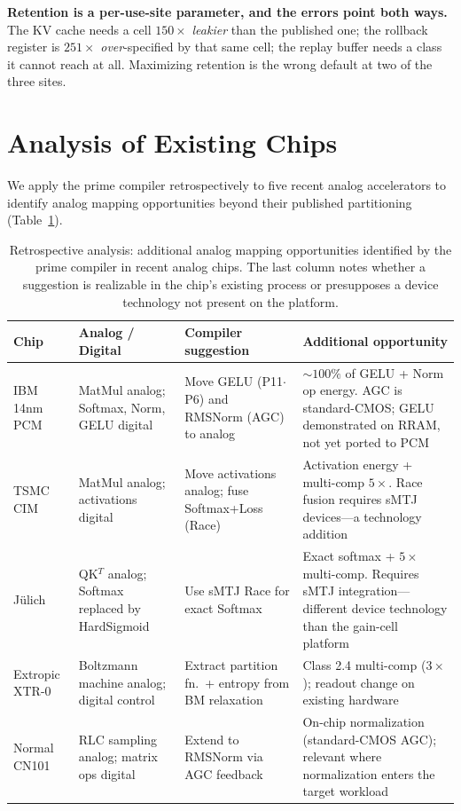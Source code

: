 \documentclass[11pt]{article}
\begin{document}
\textbf{Retention is a per-use-site parameter, and the errors point both ways.} The KV cache needs a cell $150\times$ \textit{leakier} than the published one; the rollback register is $251\times$ \textit{over}-specified by that same cell; the replay buffer needs a class it cannot reach at all. Maximizing retention is the wrong default at two of the three sites.

\section{Analysis of Existing Chips}
\label{sec:analysis}

We apply the prime compiler retrospectively to five recent analog accelerators to identify analog mapping opportunities beyond their published partitioning (Table~\ref{tab:chips}).

\begin{table}[t]
\centering
\caption{Retrospective analysis: additional analog mapping opportunities identified by the prime compiler in recent analog chips. The last column notes whether a suggestion is realizable in the chip's existing process or presupposes a device technology not present on the platform.}
\label{tab:chips}
\footnotesize
\begin{tabular}{p{2.8cm}p{2.5cm}p{2.5cm}p{4.5cm}}
\toprule
Chip & Analog / Digital & Compiler suggestion & Additional opportunity \\
\midrule
IBM 14nm PCM~\cite{ibm2025} & MatMul analog; Softmax, Norm, GELU digital & Move GELU (P11$\cdot$P6) and RMSNorm (AGC) to analog & ${\sim}100\%$ of GELU + Norm op energy. AGC is standard-CMOS; GELU demonstrated on RRAM, not yet ported to PCM \\
\midrule
TSMC CIM~\cite{tsmc2025} & MatMul analog; activations digital & Move activations analog; fuse Softmax+Loss (Race) & Activation energy + multi-comp $5\times$. Race fusion requires sMTJ devices---a technology addition \\
\midrule
J\"ulich~\cite{leroux2025a} & QK$^T$ analog; Softmax replaced by HardSigmoid & Use sMTJ Race for exact Softmax & Exact softmax + $5\times$ multi-comp. Requires sMTJ integration---different device technology than the gain-cell platform \\
\midrule
Extropic XTR-0~\cite{extropic2025} & Boltzmann machine analog; digital control & Extract partition fn.\ + entropy from BM relaxation & Class 2.4 multi-comp ($3\times$); readout change on existing hardware \\
\midrule
Normal CN101~\cite{normal2025} & RLC sampling analog; matrix ops digital & Extend to RMSNorm via AGC feedback & On-chip normalization (standard-CMOS AGC); relevant where normalization enters the target workload \\
\bottomrule
\end{tabular}
\end{table}
\end{document}
